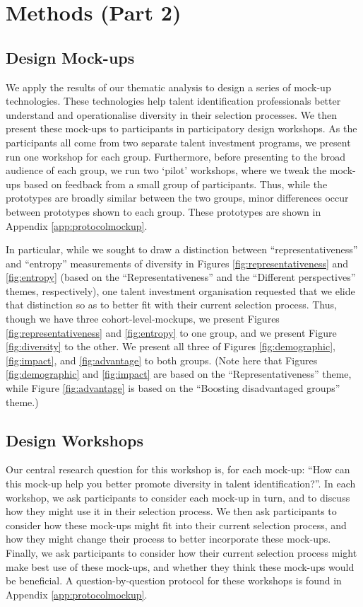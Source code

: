 \section{Methods (Part 2)}
\subsection{Design Mock-ups}
We apply the results of our thematic analysis to design a series of mock-up technologies. These technologies help talent identification professionals better understand and operationalise diversity in their selection processes. We then present these mock-ups to participants in participatory design workshops. As the participants all come from two separate talent investment programs, we present run one workshop for each group. Furthermore, before presenting to the broad audience of each group, we run two `pilot' workshops, where we tweak the mock-ups based on feedback from a small group of participants. Thus, while the prototypes are broadly similar between the two groups, minor differences occur between prototypes shown to each group. These prototypes are shown in Appendix \ref{app:protocolmockup}.

In particular, while we sought to draw a distinction between ``representativeness'' and ``entropy'' measurements of diversity in Figures \ref{fig:representativeness} and \ref{fig:entropy} (based on the ``Representativeness'' and the ``Different perspectives'' themes, respectively), one talent investment organisation requested that we elide that distinction so as to better fit with their current selection process. Thus, though we have three cohort-level-mockups, we present Figures \ref{fig:representativeness} and \ref{fig:entropy} to one group, and we present Figure \ref{fig:diversity} to the other. We present all three of Figures \ref{fig:demographic}, \ref{fig:impact}, and \ref{fig:advantage} to both groups. (Note here that Figures \ref{fig:demographic} and \ref{fig:impact} are based on the ``Representativeness'' theme, while Figure \ref{fig:advantage} is based on the ``Boosting disadvantaged groups'' theme.)

\subsection{Design Workshops}
Our central research question for this workshop is, for each mock-up: ``How can this mock-up help you better promote diversity in talent identification?''. In each workshop, we ask participants to consider each mock-up in turn, and to discuss how they might use it in their selection process. We then ask participants to consider how these mock-ups might fit into their current selection process, and how they might change their process to better incorporate these mock-ups. Finally, we ask participants to consider how their current selection process might make best use of these mock-ups, and whether they think these mock-ups would be beneficial. A question-by-question protocol for these workshops is found in Appendix \ref{app:protocolmockup}.

